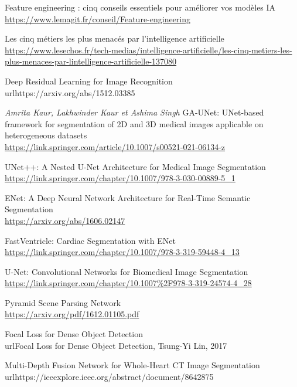 \documentclass[french, english]{article}
\begin{document}
\newpage
\begin{thebibliography}{9}

Feature engineering : cinq conseils essentiels pour améliorer vos modèles IA
\\\url{https://www.lemagit.fr/conseil/Feature-engineering}

Les cinq métiers les plus menacés par l'intelligence artificielle
\\\url{https://www.lesechos.fr/tech-medias/intelligence-artificielle/les-cinq-metiers-les-plus-menaces-par-lintelligence-artificielle-137080}

Deep Residual Learning for Image Recognition
\\url{https://arxiv.org/abs/1512.03385}

\textit{Amrita Kaur, Lakhwinder Kaur et Ashima Singh }GA-UNet: UNet-based framework for segmentation of 2D and 3D medical images applicable on heterogeneous datasets 
\\\url{https://link.springer.com/article/10.1007/s00521-021-06134-z}

UNet++: A Nested U-Net Architecture for Medical Image Segmentation
\\\url{https://link.springer.com/chapter/10.1007/978-3-030-00889-5_1}


ENet: A Deep Neural Network Architecture for Real-Time Semantic Segmentation
\\\url{https://arxiv.org/abs/1606.02147}

FastVentricle: Cardiac Segmentation with ENet
\\\url{https://link.springer.com/chapter/10.1007/978-3-319-59448-4_13}

U-Net: Convolutional Networks for Biomedical Image Segmentation 
\\\url{https://link.springer.com/chapter/10.1007\%2F978-3-319-24574-4_28 }

Pyramid Scene Parsing Network 
\\\url{https://arxiv.org/pdf/1612.01105.pdf}

Focal Loss for Dense Object Detection
\\url{Focal Loss for Dense Object Detection, Tsung-Yi Lin, 2017}

Multi-Depth Fusion Network for Whole-Heart CT Image Segmentation
\\url{https://ieeexplore.ieee.org/abstract/document/8642875}

\end{thebibliography}
\end{document}
